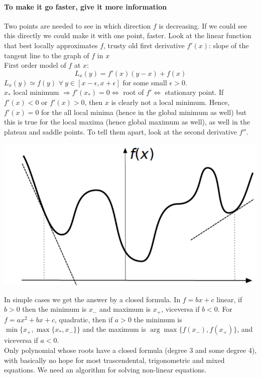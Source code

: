 \documentclass[10pt]{report}
\begin{document}
\paragraph{To make it go faster, give it more information} Two points are needed to see in which direction $f$ is decreasing. If we could see this directly we could make it with one point, faster. Look at the linear function that best locally approximates $f$, trusty old first derivative $f'(x)$: slope of the tangent line to the graph of $f$ in $x$\\
First order model of $f$ at $x$: $$L_x(y)=f'(x)(y-x) + f(x)$$ $L_x(y) \simeq f(y)$ $\forall\:y\in[x-\epsilon, x+\epsilon]$ for some small $\epsilon > 0$.\\
$x_*$ local minimum $\Rightarrow f'(x_*) = 0 \Leftrightarrow$ root of $f' \Leftrightarrow$ stationary point. If $f'(x) < 0$ or $f'(x) > 0$, then $x$ is clearly not a local minimum. Hence, $f'(x) = 0$ for the all local minima (hence in the global minimum as well) but this is true for the local maxima (hence global maximum as well), as well in the plateau and saddle points. To tell them apart, look at the second derivative $f''$.
\begin{center}
	\includegraphics[scale=0.5]{1.png}
\end{center}
In simple cases we get the answer by a closed formula. In $f = bx + c$ linear, if $b > 0$ then the minimum is $x_-$ and maximum is $x_+$, viceversa if $b < 0$. For $f = ax^2 + bx + c$, quadratic, then if $a > 0$ the minimum is $\min\{ x_+, \max\{x_*, x_-\}\}$ and the maximum is $\arg\max\{f(x_-), f(x_+)\}$, and viceversa if $a < 0$.\\
Only polynomial whose roots have a closed formula (degree 3 and some degree 4), with basically no hope for most trascendental, trigonometric and mixed equations. We need an algorithm for solving non-linear equations.
\end{document}
